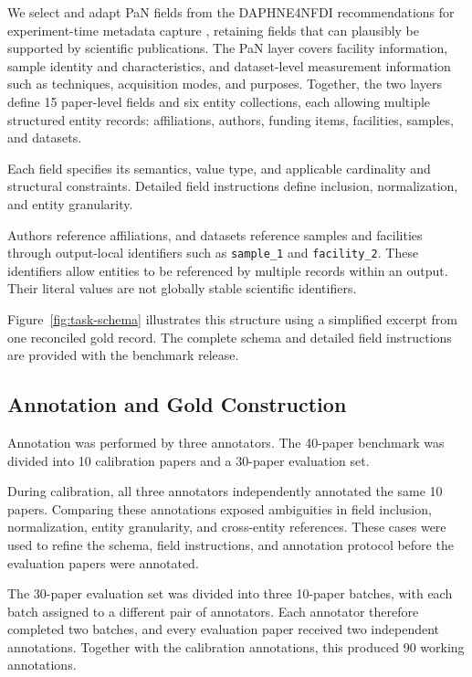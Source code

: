 We select and adapt PaN fields from the DAPHNE4NFDI recommendations for 
experiment-time metadata capture \citep{lohstroh2025daphne}, retaining fields 
that can plausibly be supported by scientific publications. The PaN layer 
covers facility information, sample identity and characteristics, and 
dataset-level measurement information such as techniques, acquisition modes, 
and purposes. Together, the two layers define 15 paper-level fields and 
six entity collections, each allowing multiple structured entity records: 
affiliations, authors, funding items, facilities, samples, and datasets.

Each field specifies its semantics, value type, and applicable cardinality 
and structural constraints. Detailed field instructions define inclusion, 
normalization, and entity granularity.

Authors reference affiliations, and datasets reference samples and facilities 
through output-local identifiers such as \texttt{sample\_1} and \texttt{facility\_2}. 
These identifiers allow entities to be referenced by multiple records within an 
output. Their literal values are not globally stable scientific identifiers.

Figure~\ref{fig:task-schema} illustrates this structure using a simplified
excerpt from one reconciled gold record. The complete schema and detailed
field instructions are provided with the benchmark release.

\subsection{Annotation and Gold Construction}
\label{sec:annotation-gold}

Annotation was performed by three annotators. The 40-paper benchmark was 
divided into 10 calibration papers and a 30-paper evaluation set.

During calibration, all three annotators independently annotated the same
10 papers. Comparing these annotations exposed ambiguities in field inclusion,
normalization, entity granularity, and cross-entity references. These cases
were used to refine the schema, field instructions, and annotation protocol
before the evaluation papers were annotated.

The 30-paper evaluation set was divided into three 10-paper batches, with each
batch assigned to a different pair of annotators. Each annotator therefore
completed two batches, and every evaluation paper received two independent 
annotations. Together with the calibration annotations, this produced 90 working 
annotations.

